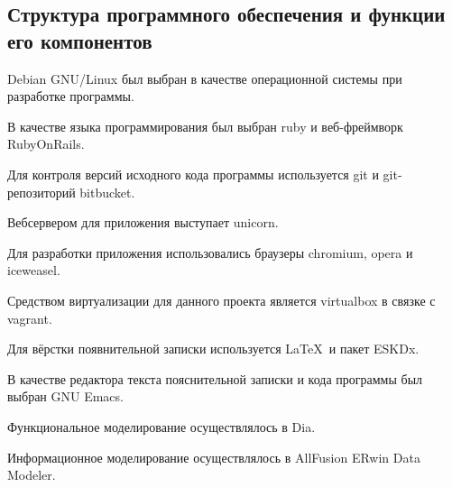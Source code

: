 \subsection{Структура программного обеспечения и функции его компонентов}

Debian GNU/Linux был выбран в качестве операционной системы при разработке программы.

В качестве языка программирования был выбран ruby и веб-фреймворк RubyOnRails.

Для контроля версий исходного кода программы используется git и git-репозиторий bitbucket.

Вебсервером для приложения выступает unicorn.

Для разработки приложения использовались браузеры chromium, opera и iceweasel.

Средством виртуализации для данного проекта является virtualbox в связке с vagrant.

Для вёрстки появнительной записки используется \LaTeX~и пакет ESKDx.

В качестве редактора текста пояснительной записки и кода программы был выбран GNU Emacs.

Функциональное моделирование осуществлялось в Dia.

Информационное моделирование осуществлялось в AllFusion ERwin Data Modeler.
